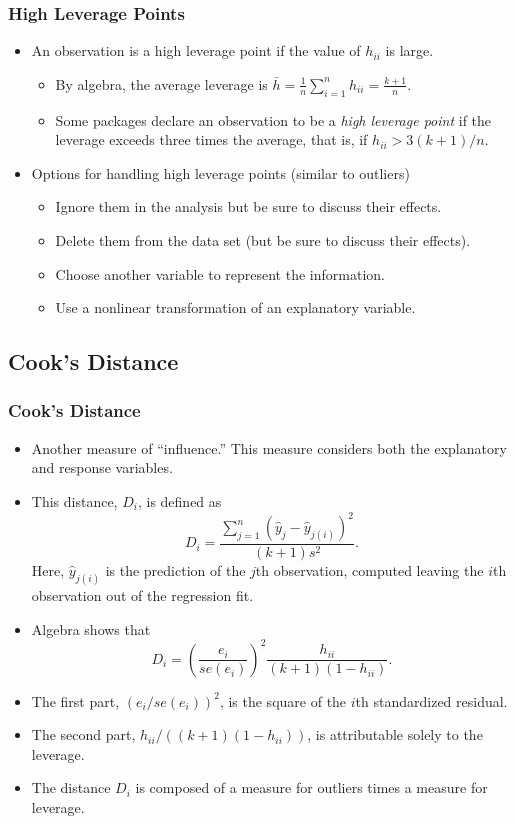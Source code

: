 \begin{frame}%
 \frametitle{High Leverage Points}
 \begin{itemize}
   \item An observation is a high leverage point if the value of
   $h_{ii}$ is large.
 \begin{itemize}
   \item By algebra, the average leverage is $\bar{h}=\frac{1}{n}\sum_{i=1}^{n}h_{ii}=\frac{k+1}{n}.$
\item Some packages declare an observation to be a
\textit{high leverage point} if the leverage exceeds three times the
average, that is, if $h_{ii}>3(k+1)/n $.
  \end{itemize}
  \item Options for handling high leverage points (similar to
  outliers)
   \begin{itemize}
   \item  Ignore them in the analysis but be sure to discuss their
effects.
\item  Delete them from the data set (but be sure to discuss their
effects).
\item Choose another variable to represent the information.
\item  Use a nonlinear transformation of an explanatory variable.

    \end{itemize}
    \end{itemize}
\end{frame}

\subsection{Cook's Distance}


\begin{frame}[shrink=2]
 \frametitle{Cook's Distance}
 \begin{itemize}
   \item Another measure of ``influence.''  This measure considers both the explanatory and response
   variables.
   \item This distance, $D_{i}$, is defined as
\begin{equation*}
D_{i} =
\frac{\sum_{j=1}^{n}(\hat{y}_{j}-\hat{y}_{j(i)})^{2}}{(k+1)s^{2}}.
\end{equation*}
Here, $\hat{y}_{j(i)}$ is the prediction of the $j$th observation,
computed leaving the $i$th observation out of the regression fit.
\item Algebra shows that
\begin{equation*}
D_{i} =
\left(\frac{e_i}{se(e_i)}\right)^{2}\frac{h_{ii}}{(k+1)(1-h_{ii})}.
\end{equation*}
\item The first part, $(e_i/se(e_i))^{2}$, is the square of the $i$th
standardized residual.
\item The second part, $h_{ii}/((k+1)(1-h_{ii}))$,
is attributable solely to the leverage.
\item The distance $D_{i}$
is composed of a measure for outliers times a measure for leverage.
    \end{itemize}
\end{frame}



